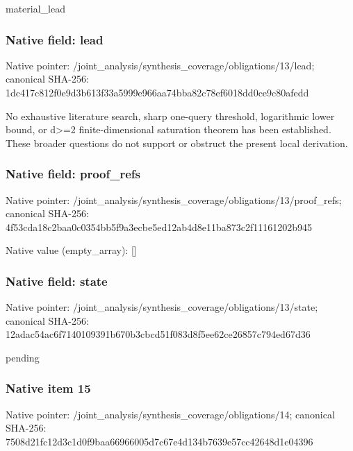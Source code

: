 \documentclass[10pt,a4paper]{article}
\begin{document}
\begingroup\raggedright\sloppy material\_\allowbreak{}lead\par\endgroup

\subsubsection{Native field: lead}
Native pointer: /joint\_\allowbreak{}analysis/synthesis\_\allowbreak{}coverage/obligations/13/lead; canonical SHA-256: 1dc417c812f0e9d3b613f33a5999e966aa74bba82c78ef6018dd0ce9c80afedd

\begingroup\raggedright\sloppy No exhaustive literature search,\allowbreak{} sharp one-query threshold,\allowbreak{} logarithmic lower bound,\allowbreak{} or d>=\allowbreak{}2 finite-dimensional saturation theorem has been established. These broader questions do not support or obstruct the present local derivation.\par\endgroup

\subsubsection{Native field: proof\_\allowbreak{}refs}
Native pointer: /joint\_\allowbreak{}analysis/synthesis\_\allowbreak{}coverage/obligations/13/proof\_\allowbreak{}refs; canonical SHA-256: 4f53cda18c2baa0c0354bb5f9a3ecbe5ed12ab4d8e11ba873c2f11161202b945

Native value (empty\_\allowbreak{}array): []

\subsubsection{Native field: state}
Native pointer: /joint\_\allowbreak{}analysis/synthesis\_\allowbreak{}coverage/obligations/13/state; canonical SHA-256: 12adac54ac6f7140109391b670b3cbcd51f083d8f5ee62ce26857c794ed67d36

\begingroup\raggedright\sloppy pending\par\endgroup

\subsubsection{Native item 15}
Native pointer: /joint\_\allowbreak{}analysis/synthesis\_\allowbreak{}coverage/obligations/14; canonical SHA-256: 7508d21fc12d3c1d0f9baa66966005d7c67e4d134b7639e57cc42648d1e04396
\end{document}
